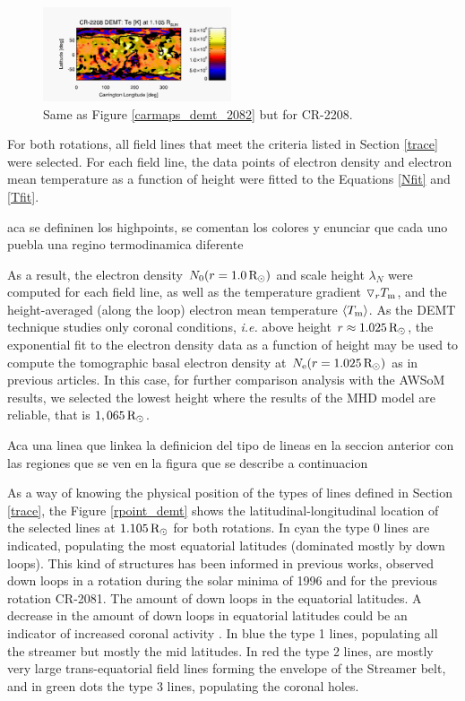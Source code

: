 \documentclass[namedreferences]{solarphysics}
\newcommand{\mrsun}{{\rm R_\odot}}
\newcommand{\lN}{\lambda_N}
\newcommand{\aTm}{\left<\Tm\right>}
\newcommand{\dr}{\triangledown_r}
\newcommand{\Tm}{T_{\rm m}}
\newcommand{\Ne}{N_{\rm e}}
\def\temp#1{\textcolor{mygray}{#1}}
\begin{document}
\begin{article}
\begin{figure}[h!]
\begin{center}
\includegraphics[width=0.495\textwidth]{figs/map_Tm_CR2208_DEMT-AIA_H1_L522_r3d_1105_Rsun.pdf}
\caption{Same as Figure \ref{carmaps_demt_2082} but for CR-2208.}
\label{carmaps_demt_2208}
\end{center}
\end{figure}


For both rotations, all field lines that meet the criteria listed in Section \ref{trace} were selected. For each field line, the data points of electron density and electron mean temperature as a function of height were fitted to the Equations \ref{Nfit} and \ref{Tfit}.

\temp{aca se defininen los highpoints, se comentan los colores y enunciar que cada uno puebla una regino termodinamica diferente}


 As a result, the electron density $N_0(r=1.0\,\mrsun)$ and scale height $\lN$ were computed for each field line, as well as the temperature gradient $\dr \Tm$, and the height-averaged (along the loop) electron mean temperature $\aTm$. As the DEMT technique studies only coronal conditions, \textit{i.e.} above height $r\approx 1.025\,\mrsun$, the exponential fit to the electron density data as a function of height may be used to compute the tomographic basal electron density at $ \Ne(r=1.025\,\mrsun)$ as in previous articles. In this case, for further comparison analysis with the AWSoM results, we selected the lowest height where the results of the MHD model are reliable, that is $1,065\,\mrsun$.

\temp{Aca una linea que linkea la definicion del tipo de lineas en la seccion anterior con las regiones que se ven en la figura que se describe a continuacion}

As a way of knowing the physical position of the types of lines defined in Section \ref{trace}, the Figure \ref{rpoint_demt} shows the latitudinal-longitudinal location of the selected lines at $1.105\,\mrsun$ for both rotations. In cyan the type 0 lines are indicated, populating the most equatorial latitudes (dominated mostly by down loops). This kind of structures has been informed in previous works, \citet{lloveras_2017} observed down loops in a rotation during the solar minima of 1996 and for the previous rotation CR-2081. The amount of down loops in the equatorial latitudes. A decrease in the amount of down loops in equatorial latitudes could be an indicator of increased coronal activity \citet{nuevo_2013}. In blue the type 1 lines, populating all the streamer but mostly the mid latitudes. In red the type 2 lines, are mostly very large trans-equatorial field lines forming the envelope of the Streamer belt, and in green dots the type 3 lines, populating the coronal holes.


\end{article}
\end{document}
